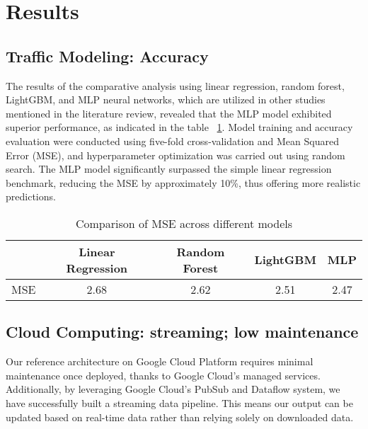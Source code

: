 \documentclass{report}
\begin{document}
\section{Results}
\subsection{Traffic Modeling: Accuracy}
The results of the comparative analysis using linear regression, random forest, LightGBM, and MLP neural networks, which are utilized in other studies mentioned in the literature review, revealed that the MLP model exhibited superior performance, as indicated in the table ~\ref{table:mse_comparison_transposed}. Model training and accuracy evaluation were conducted using five-fold cross-validation and Mean Squared Error (MSE), and hyperparameter optimization was carried out using random search.
The MLP model significantly surpassed the simple linear regression benchmark, reducing the MSE by approximately 10\%, thus offering more realistic predictions.

\begin{table}[ht]
\centering
\begin{tabular}{|l|c|c|c|c|}
\hline
 & Linear Regression & Random Forest & LightGBM & MLP \\ \hline
MSE & 2.68 & 2.62 & 2.51 & 2.47 \\
\hline
\end{tabular}
\caption{Comparison of MSE across different models}
\label{table:mse_comparison_transposed}
\end{table}



\subsection{Cloud Computing: streaming; low maintenance}
Our reference architecture on Google Cloud Platform requires minimal maintenance once deployed, thanks to Google Cloud's managed services. Additionally, by leveraging Google Cloud’s PubSub and Dataflow system, we have successfully built a streaming data pipeline. This means our output can be updated based on real-time data rather than relying solely on downloaded data.
\end{document}
